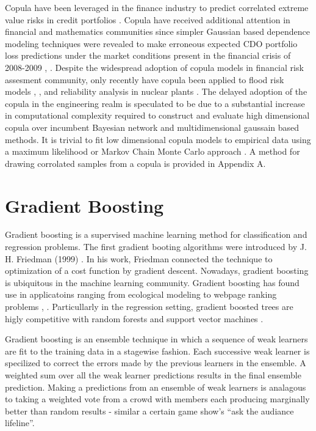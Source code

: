 Copula have been leveraged in the finance industry to
predict correlated extreme value risks in credit portfolios
\cite{Geidosch2016}.  Copula have received additional attention in financial and mathematics communities since 
simpler Gaussian based dependence modeling techniques were revealed to make erroneous expected CDO portfolio loss predictions under the market conditions present in the financial crisis of
2008-2009 \cite{MacKenzie2013}, \cite{Li2000}.  Despite the widespread adoption of copula models in financial risk assesment community, only recently have copula been applied to flood risk
models \cite{Dupuis2007}, \cite{Ganguli2012}, and reliability analysis in nuclear plants
\cite{Kelly2007}.  The delayed adoption of the copula in the
engineering realm is speculated to be due to a substantial increase in computational
complexity required to construct and evaluate high dimensional copula over
incumbent Bayesian network and multidimensional gaussain based methods.  
It is trivial to fit low dimensional copula models to empirical data
using a maximum likelihood or Markov Chain Monte Carlo approach \cite{Jouini1996}.
A method for drawing corrolated samples from a copula is provided in Appendix A.

\section{Gradient Boosting}

Gradient boosting is a supervised machine learning method for classification and regression problems.
The first gradient booting algorithms were introduced by J. H. Friedman (1999) \cite{friedman2001}.  In his work, Friedman connected the technique to optimization of a cost function by gradient descent.
Nowadays, gradient boosting is ubiquitous in the machine learning community.  Gradient boosting has found use in applicatoins ranging from ecological modeling \cite{death2007} to webpage ranking problems \cite{Tyree2011}, \cite{chapelle2011}.  Particullarly in the regression setting, gradient boosted trees are higly competitive with random forests and support vector machines \cite{moisen2006}. 

Gradient boosting is an ensemble technique in which a sequence of weak learners are fit to the training data in a stagewise fashion.  Each successive weak learner is specilized to correct the errors made by the previous learners in the ensemble.  A weighted sum over all the weak learner predictions results in the final ensemble prediction.  Making a predictions from an ensemble of weak learners is analagous to taking a weighted vote from a crowd with members each producing marginally better than random results - similar a certain game show's ``ask the audiance lifeline''.  

